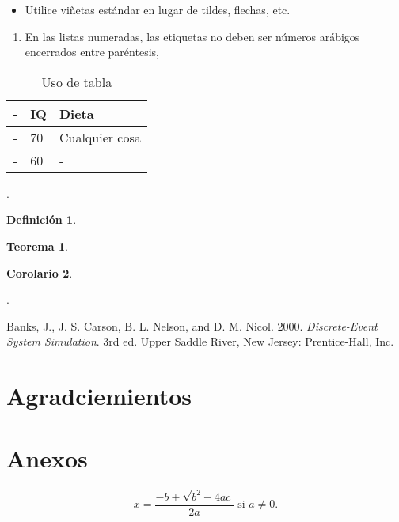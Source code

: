 \documentclass{wscpaperproc}
\theoremstyle{wsc}
\newtheorem{theorem}{Teorema}
\newtheorem{corollary}[theorem]{Corolario}
\newtheorem{definition}{Definici\'on}
\begin{document}
\begin{itemize}
	\item Utilice vi\~netas est\'andar en lugar de tildes, flechas, etc.
\end{itemize}
\begin{enumerate}
	\item En las listas numeradas, las etiquetas no deben ser n\'umeros ar\'abigos encerrados entre par\'entesis, \cite{simulation}
\end{enumerate}


\begin{table}[htb]
\centering
\caption{Uso de tabla\label{tab: first}}
\begin{tabular}{rll}
\hline
-& IQ & Dieta\\ \hline
- & 70 & Cualquier cosa\\
- & 60 &- \\
\hline
\end{tabular}
\end{table}


.
\begin{definition}

\end{definition}

\begin{theorem}

\end{theorem}

\begin{corollary}

\end{corollary}

.



{\footnotesize
\begin{hangref}
\item Banks, J., J. S. Carson, B. L. Nelson, and D. M. Nicol. 2000. \textit{Discrete-Event System Simulation}. 3rd ed. Upper Saddle River, New Jersey: Prentice-Hall, Inc.
\end{hangref}
}










\section*{Agradciemientos}


\appendix

\section{Anexos} \label{app:quadratic}

\begin{equation} \label{eq:quadraticsol}
x = \frac{-b \pm \sqrt{b^2-4ac}}{2a} \mbox{ si } a \ne 0.
\end{equation}
\end{document}

